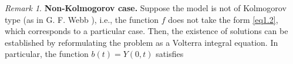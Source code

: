 \documentclass[10pt, a4paper]{amsart}
\theoremstyle{plain}
\theoremstyle{definition}
\theoremstyle{remark}
\newtheorem{remark}[lemma]{Remark}
\numberwithin{equation}{section}
\begin{document}
\begin{remark}\label{re2.8}
{\bf Non-Kolmogorov case.} Suppose the model is not of Kolmogorov type (as in G. F. Webb \cite{ref48}), i.e., the function $f$ does not take the form \eqref{eq1.2}, which corresponds to a particular case. Then, the existence of solutions can be established by reformulating the problem as a Volterra integral equation. In particular, the function $b(t) = Y(0,t)$ satisfies


\end{remark}
\end{document}
